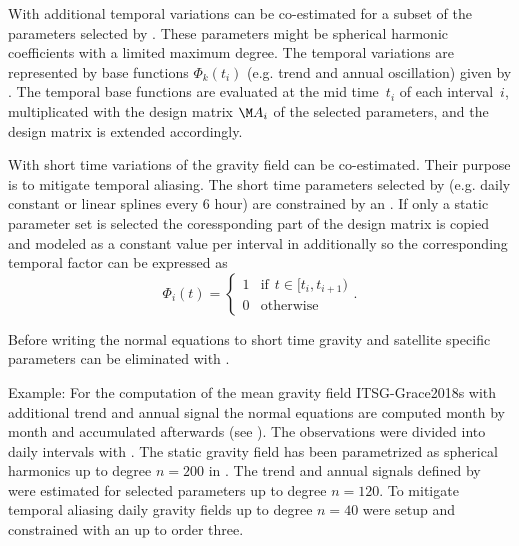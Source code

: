 With  additional temporal variations can be co-estimated
for a subset of the parameters selected by .
These parameters might be spherical harmonic coefficients with a limited maximum degree.
The temporal variations are represented by base functions $\Phi_k(t_i)$ (e.g. trend and annual oscillation)
given by .
The temporal base functions are evaluated at the mid time~$t_i$ of each interval~$i$, multiplicated
with the design matrix $\M A_i$ of the selected parameters, and the design matrix is extended
accordingly.


With  short time variations of the gravity field can be co-estimated.
Their purpose is to mitigate temporal aliasing.
The short time parameters selected by 
(e.g. daily constant or linear splines every 6 hour) are constrained by an
. If only a static parameter
set is selected the coressponding part of the design matrix is copied and modeled as a constant value
per interval in  additionally so the corresponding temporal factor can be expressed as
\begin{equation}
  \Phi_i(t)  =
  \begin{cases}
    1 &\text{if} \hspace{5pt} t \in [t_i, t_{i+1}) \\
    0 & \text{otherwise}
  \end{cases}.
\end{equation}

Before writing the normal equations to 
short time gravity and satellite specific parameters can be eliminated with .

Example: For the computation of the mean gravity field ITSG-Grace2018s with additional trend and annual signal
the normal equations are computed month by month and accumulated afterwards (see ).
The observations were divided into daily intervals with .
The static gravity field has been parametrized as spherical harmonics
up to degree $n=200$ in .
The trend and annual signals defined by
were estimated for selected parameters up to degree $n=120$.
To mitigate temporal aliasing daily gravity fields up to degree $n=40$ were setup and constrained
with an  up to order three.


